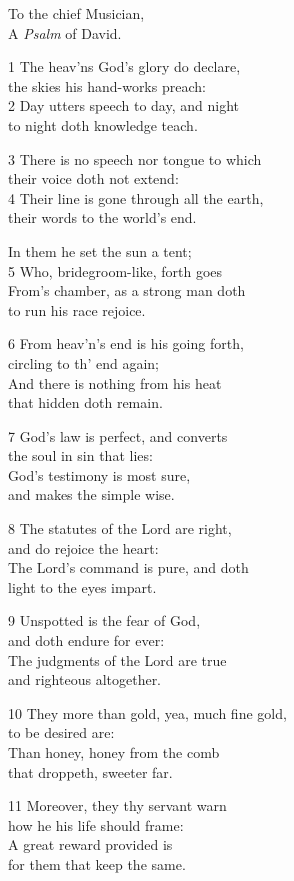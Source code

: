 \begin{multicols}{3}
To the chief Musician,\\
A \emph{Psalm} of David.

1 The heav’ns God’s glory do declare,\\
the skies his hand-works preach:\\
2 Day utters speech to day, and night\\
to night doth knowledge teach.

3 There is no speech nor tongue to which\\
their voice doth not extend:\\
4 Their line is gone through all the earth,\\
their words to the world’s end.

In them he set the sun a tent;\\
5 Who, bridegroom-like, forth goes\\
From’s chamber, as a strong man doth\\
to run his race rejoice.

6 From heav’n’s end is his going forth,\\
circling to th’ end again;\\
And there is nothing from his heat\\
that hidden doth remain.

7 God’s law is perfect, and converts\\
the soul in sin that lies:\\
God’s testimony is most sure,\\
and makes the simple wise.

8 The statutes of the Lord are right,\\
and do rejoice the heart:\\
The Lord’s command is pure, and doth\\
light to the eyes impart.

9 Unspotted is the fear of God,\\
and doth endure for ever:\\
The judgments of the Lord are true\\
and righteous altogether.

10 They more than gold, yea, much fine gold,\\
to be desired are:\\
Than honey, honey from the comb\\
that droppeth, sweeter far.

11 Moreover, they thy servant warn\\
how he his life should frame:\\
A great reward provided is\\
for them that keep the same.


\end{multicols}
